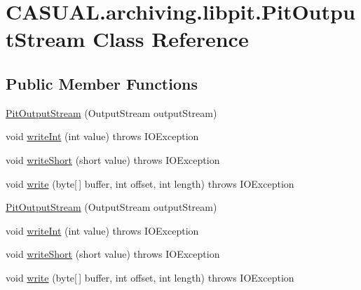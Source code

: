 \hypertarget{class_c_a_s_u_a_l_1_1archiving_1_1libpit_1_1_pit_output_stream}{\section{C\-A\-S\-U\-A\-L.\-archiving.\-libpit.\-Pit\-Output\-Stream Class Reference}
\label{class_c_a_s_u_a_l_1_1archiving_1_1libpit_1_1_pit_output_stream}
}
\subsection*{Public Member Functions}
\begin{DoxyCompactItemize}
\item 
\hyperlink{class_c_a_s_u_a_l_1_1archiving_1_1libpit_1_1_pit_output_stream_aa49dca8c904234bb8426f1d4171912b4}{Pit\-Output\-Stream} (Output\-Stream output\-Stream)
\item 
void \hyperlink{class_c_a_s_u_a_l_1_1archiving_1_1libpit_1_1_pit_output_stream_a43249fc4dc1170fe30b8e2417acb6c8a}{write\-Int} (int value)  throws I\-O\-Exception 
\item 
void \hyperlink{class_c_a_s_u_a_l_1_1archiving_1_1libpit_1_1_pit_output_stream_a1bb9dc0dd6dc712dad5a1c07093cee15}{write\-Short} (short value)  throws I\-O\-Exception 
\item 
void \hyperlink{class_c_a_s_u_a_l_1_1archiving_1_1libpit_1_1_pit_output_stream_aebcdfb1294537dd6a5f3268b7fea9940}{write} (byte\mbox{[}$\,$\mbox{]} buffer, int offset, int length)  throws I\-O\-Exception 
\item 
\hyperlink{class_c_a_s_u_a_l_1_1archiving_1_1libpit_1_1_pit_output_stream_aa49dca8c904234bb8426f1d4171912b4}{Pit\-Output\-Stream} (Output\-Stream output\-Stream)
\item 
void \hyperlink{class_c_a_s_u_a_l_1_1archiving_1_1libpit_1_1_pit_output_stream_a43249fc4dc1170fe30b8e2417acb6c8a}{write\-Int} (int value)  throws I\-O\-Exception 
\item 
void \hyperlink{class_c_a_s_u_a_l_1_1archiving_1_1libpit_1_1_pit_output_stream_a1bb9dc0dd6dc712dad5a1c07093cee15}{write\-Short} (short value)  throws I\-O\-Exception 
\item 
void \hyperlink{class_c_a_s_u_a_l_1_1archiving_1_1libpit_1_1_pit_output_stream_aebcdfb1294537dd6a5f3268b7fea9940}{write} (byte\mbox{[}$\,$\mbox{]} buffer, int offset, int length)  throws I\-O\-Exception 
\end{DoxyCompactItemize}


